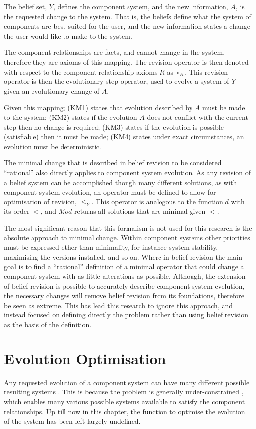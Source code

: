 The belief set, $Y$, defines the component system,
and the new information, $A$, is the requested change to the system.
That is, the beliefs define what the system of components are best suited for the user, and the new information states a change the user would like to make to the system.

The component relationships are facts, and cannot change in the system, therefore they are axioms of this mapping.
The revision operator is then denoted with respect to the component relationship axioms $R$ as $\circ_R$.
This revision operator is then the evolutionary step operator, used to evolve a system of $Y$ given an evolutionary change of $A$.

Given this mapping; (KM1) states that evolution described by $A$ must be made to the system; 
(KM2) states if the evolution $A$ does not conflict with the current step then no change is required;
(KM3) states if the evolution is possible (satisfiable) then it must be made;
(KM4) states under exact circumstances, an evolution must be deterministic.

The minimal change that is described in belief revision to be considered ``rational'' also directly applies to component system evolution.
As any revision of a belief system can be accomplished though many different solutions, as with component system evolution, 
an operator must be defined to allow for optimisation of revision, $\leq_{Y}$.
This operator is analogous to the function $d$ with its order $<$, and $Mod$ returns all solutions that are minimal given $<$.

The most significant reason that this formalism is not used for this research is the absolute approach to minimal change.
Within component systems other priorities must be expressed other than minimality, for instance system stability, maximising the versions installed, and so on.
Where in belief revision the main goal is to find a ``rational'' definition of a minimal operator that could change a component system with as little alterations as possible.
Although, the extension of belief revision is possible to accurately describe component system evolution, the necessary changes will remove belief revision from its foundations,
therefore be seen as extreme.
This has lead this research to ignore this approach, and instead focused on defining directly the problem rather than using belief revision as the basis of the definition. 

\section{Evolution Optimisation}
\label{formal.opt}
Any requested evolution of a component system can have many different possible resulting systems \cite{leBerre2010}.
This is because the problem is generally under-constrained \cite{leberre2008}, which enables many various possible systems available to satisfy the component relationships.
Up till now in this chapter, the function to optimise the evolution of the system has been left largely undefined.


